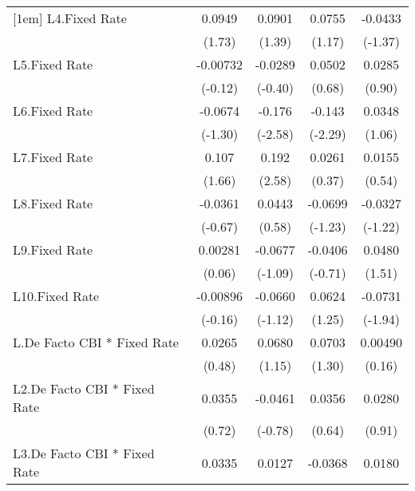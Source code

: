 {\begin{longtable}{l*{4}{c}}
[1em]
L4.Fixed Rate   &   0.0949         &   0.0901         &   0.0755         &  -0.0433         \\
                &   (1.73)         &   (1.39)         &   (1.17)         &  (-1.37)         \\
[1em]
L5.Fixed Rate   & -0.00732         &  -0.0289         &   0.0502         &   0.0285         \\
                &  (-0.12)         &  (-0.40)         &   (0.68)         &   (0.90)         \\
[1em]
L6.Fixed Rate   &  -0.0674         &   -0.176\sym{**} &   -0.143\sym{*}  &   0.0348         \\
                &  (-1.30)         &  (-2.58)         &  (-2.29)         &   (1.06)         \\
[1em]
L7.Fixed Rate   &    0.107         &    0.192\sym{**} &   0.0261         &   0.0155         \\
                &   (1.66)         &   (2.58)         &   (0.37)         &   (0.54)         \\
[1em]
L8.Fixed Rate   &  -0.0361         &   0.0443         &  -0.0699         &  -0.0327         \\
                &  (-0.67)         &   (0.58)         &  (-1.23)         &  (-1.22)         \\
[1em]
L9.Fixed Rate   &  0.00281         &  -0.0677         &  -0.0406         &   0.0480         \\
                &   (0.06)         &  (-1.09)         &  (-0.71)         &   (1.51)         \\
[1em]
L10.Fixed Rate  & -0.00896         &  -0.0660         &   0.0624         &  -0.0731         \\
                &  (-0.16)         &  (-1.12)         &   (1.25)         &  (-1.94)         \\
[1em]
L.De Facto CBI * Fixed Rate&   0.0265         &   0.0680         &   0.0703         &  0.00490         \\
                &   (0.48)         &   (1.15)         &   (1.30)         &   (0.16)         \\
[1em]
L2.De Facto CBI * Fixed Rate&   0.0355         &  -0.0461         &   0.0356         &   0.0280         \\
                &   (0.72)         &  (-0.78)         &   (0.64)         &   (0.91)         \\
[1em]
L3.De Facto CBI * Fixed Rate&   0.0335         &   0.0127         &  -0.0368         &   0.0180         \\

\end{longtable}}
